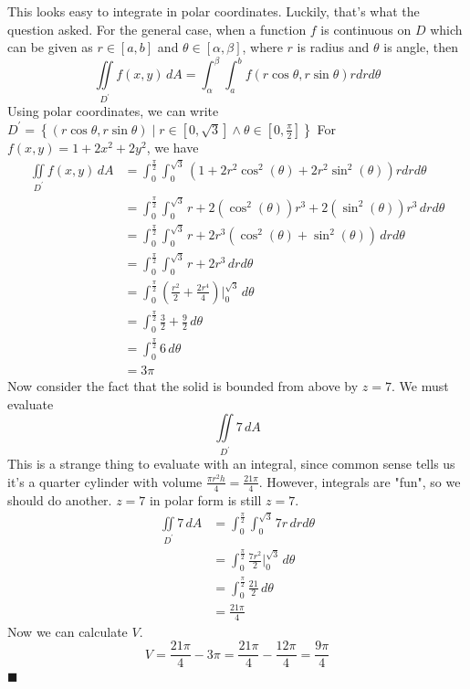 \documentclass[12pt, letterpaper]{report}
\begin{document}
This looks easy to integrate in polar coordinates. Luckily, that's what the question asked. For the general case, when a function \(f\) is continuous on \(D\) which can be given as \(r\in [a,b]\) and \(\theta \in[\alpha ,\beta ]\), where \(r\) is radius and \(\theta \) is angle, then 
\[
    \iint\limits_{D^{\prime} }f(x,y)\,dA = \int_\alpha ^\beta \int_a^b f \left( r\cos \theta ,r\sin \theta  \right)rdrd \theta 
\]
Using polar coordinates, we can write \(D^{\prime} =\left\{ (r\cos \theta ,r\sin \theta )\mid r\in[0,\sqrt{3} ]\land \theta \in \left[0,\frac{\pi}{2}\right] \right\} \) For \(f(x,y)=1+2x^2 +2y^2\), we have 
\begin{align*}
    \iint\limits_{D^{\prime} }f(x,y)\,dA &= \int_{0}^{\frac{\pi}{2}}\int_{0}^{\sqrt{3} }\left( 1+2r^2 \cos ^2(\theta )+2r^2 \sin ^2(\theta ) \right) rdrd \theta\\
    &= \int_{0}^{\frac{\pi}{2}}\int_{0}^{\sqrt{3} }r+2\left( \cos ^2(\theta ) \right)r^3 + 2\left( \sin ^2(\theta ) \right)r^3\,drd \theta \\
    &=\int_{0}^{\frac{\pi}{2}}\int_{0}^{\sqrt{3} } r+2r^3 \left( \cos ^2 (\theta )+\sin ^2(\theta ) \right) \,drd \theta \\
    &= \int_{0}^{\frac{\pi}{2}}\int_{0}^{\sqrt{3} } r+2r^3\,drd \theta \\
    &=\int_{0}^{\frac{\pi}{2}}\left( \frac{r^2}{2}+\frac{2r^4}{4}\right)\bigg|_{0}^{\sqrt{3} }\,d \theta \\
    &= \int_{0}^{\frac{\pi}{2} } \frac{3}{2}+\frac{9}{2}\,d \theta \\
    &=\int_{0}^{\frac{\pi}{2} }6\,d \theta \\
    &= 3\pi
\end{align*}
Now consider the fact that the solid is bounded from above by \(z=7\). We must evaluate 
\[
    \iint\limits_{D^{\prime} }7\,dA
\]
This is a strange thing to evaluate with an integral, since common sense tells us it's a quarter cylinder with volume \(\frac{\pi r^2 h}{4}=\frac{21\pi }{4}\). However, integrals are "fun", so we should do another. \(z=7\) in polar form is still \(z=7\).
\begin{align*}
    \iint\limits_{D^{\prime} }7\,dA&=\int_{0}^{\frac{\pi}{2}}\int_{0}^{\sqrt{3} }7r\,drd \theta \\
    &=\int_{0}^{\frac{\pi}{2}}\frac{7r^2}{2}\bigg| _0^{\sqrt{3} } \,d \theta \\
    &= \int_{0}^{\frac{\pi}{2}} \frac{21}{2}\,d \theta \\
    &= \frac{21\pi}{4}
\end{align*}
Now we can calculate \(V\). 
\[
    V= \frac{21\pi}{4}-3\pi =\frac{21\pi}{4}-\frac{12\pi}{4}=\frac{9\pi }{4}
\]
\hfill\(\blacksquare\) 
\end{document}
